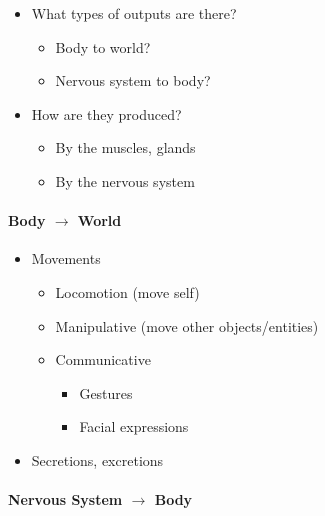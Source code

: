 \documentclass[
  letterpaper,
  DIV=11,
  numbers=noendperiod]{scrartcl}
\let\oldparagraph\paragraph
\renewcommand{\paragraph}[1]{\oldparagraph{#1}\mbox{}}
\providecommand{\tightlist}{%
  \setlength{\itemsep}{0pt}\setlength{\parskip}{0pt}}\usepackage{longtable,booktabs,array}
\begin{document}
\begin{itemize}
\tightlist
\item
  What types of outputs are there?

  \begin{itemize}
  \tightlist
  \item
    Body to world?
  \item
    Nervous system to body?
  \end{itemize}
\item
  How are they produced?

  \begin{itemize}
  \tightlist
  \item
    By the muscles, glands
  \item
    By the nervous system
  \end{itemize}
\end{itemize}

\paragraph{\texorpdfstring{Body \(\rightarrow\)
World}{Body \textbackslash rightarrow World}}\label{body-rightarrow-world}

\begin{itemize}
\tightlist
\item
  Movements

  \begin{itemize}
  \tightlist
  \item
    Locomotion (move self)
  \item
    Manipulative (move other objects/entities)
  \item
    Communicative

    \begin{itemize}
    \tightlist
    \item
      Gestures
    \item
      Facial expressions
    \end{itemize}
  \end{itemize}
\item
  Secretions, excretions
\end{itemize}

\paragraph{\texorpdfstring{Nervous System \(\rightarrow\)
Body}{Nervous System \textbackslash rightarrow Body}}\label{nervous-system-rightarrow-body}
\end{document}
